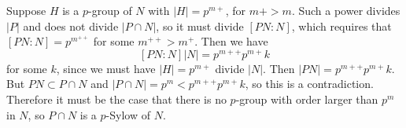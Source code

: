 \documentclass{article}
\begin{document}
\begin{Answer}
\begin{enumerate}[(a)]
{    Suppose $H$ is a $p$-group of $N$ with $|H| = p^{m+}$, for
    $m+ > m$. Such a power
    divides $|P|$ and does not divide $|P \cap N|$, so it must divide
    $[PN : N]$, which requires that $[PN : N] = p^{m^{++}}$ for some
    $m^{++} > m^+$. Then we have
    $$
    [PN : N] |N| = p^{m++} p^{m+} k
    $$
    for some $k$, since we must have $|H| = p^{m+}$ divide $|N|$.
    Then $|PN| = p^{m++}p^{m+} k$. But $PN \subset P \cap N$ and
    $|P \cap N| = p^m < p^{m++}p^{m+} k$, so this is a
    contradiction. Therefore it must be the case that there is no
    $p$-group with order larger than $p^m$ in $N$, so $P \cap N$ is a
    $p$-Sylow of $N$.


  }
\end{enumerate}
\end{Answer}
\end{document}
